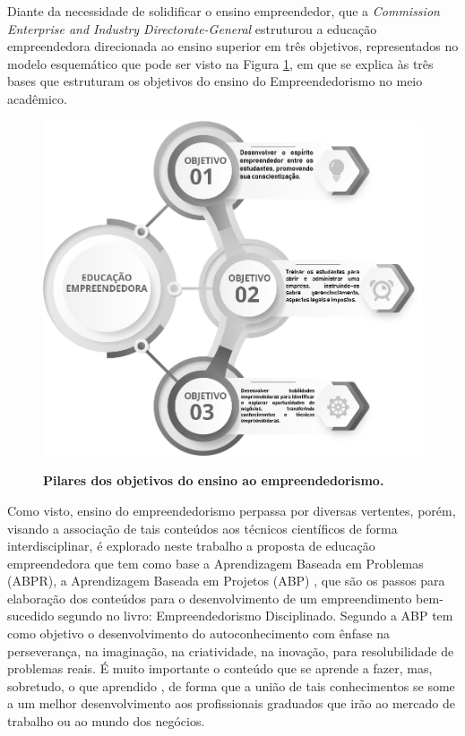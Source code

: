 Diante da necessidade de solidificar o ensino empreendedor, que a \textit{Commission Enterprise and Industry Directorate-General} \cite{european_commission_best_2008} estruturou a educação empreendedora direcionada ao ensino superior em três objetivos, representados no modelo esquemático que pode ser visto na Figura \ref{figura_3}, em que se explica às três bases que estruturam os objetivos do ensino do Empreendedorismo no meio acadêmico. 

\begin{figure}[!htb]
\centering
\caption{\textbf{Pilares dos objetivos do ensino ao empreendedorismo.}}
\includegraphics[scale=0.6]{Imagens/objetivos_educacao_empreendedora.png}
\label{figura_3}
\end{figure}
\newpage

Como visto, ensino do empreendedorismo perpassa por diversas vertentes, porém, visando a associação de tais conteúdos aos técnicos científicos de forma interdisciplinar, é explorado neste trabalho a proposta de educação empreendedora que tem como base a Aprendizagem Baseada em Problemas (ABPR), a Aprendizagem Baseada em Projetos (ABP) \cite{bender_aprendizagem_2015} , que são os passos para elaboração dos conteúdos para o desenvolvimento de um empreendimento bem-sucedido segundo \cite{aulet_empreendedorismo_2019} no livro: Empreendedorismo Disciplinado. 
Segundo \cite{bender_aprendizagem_2015}a ABP tem como objetivo o desenvolvimento do autoconhecimento com ênfase na perseverança, na imaginação, na criatividade, na inovação, para resolubilidade de problemas reais. É muito importante o conteúdo que se aprende a fazer, mas, sobretudo, o que aprendido \cite{souza_disseminacao_2001}, de forma que a união de tais conhecimentos se some a um melhor desenvolvimento aos profissionais graduados que irão ao mercado de trabalho ou ao mundo dos negócios. 

